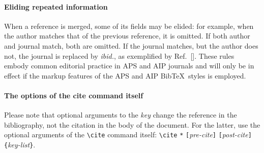 \documentclass[%
 reprint,
 amsmath,amssymb,
 aps,
]{revtex4-1}
\begin{document}
\paragraph{Eliding repeated information}
When a reference is merged, some of its fields may be elided: for example, 
when the author matches that of the previous reference, it is omitted. 
If both author and journal match, both are omitted.
If the journal matches, but the author does not, the journal is replaced by \emph{ibid.},
as exemplified by Ref.~[]. 
These rules embody common editorial practice in APS and AIP journals and will only
be in effect if the markup features of the APS and AIP Bib\TeX\ styles is employed.

\paragraph{The options of the cite command itself}
Please note that optional arguments to the \emph{key} change the reference in the bibliography, 
not the citation in the body of the document. 
For the latter, use the optional arguments of the \verb+\cite+ command itself:
\verb+\cite+ \texttt{*}\allowbreak
\texttt{[}\emph{pre-cite}\texttt{]}\allowbreak
\texttt{[}\emph{post-cite}\texttt{]}\allowbreak
\verb+{+\emph{key-list}\verb+}+.
\end{document}
